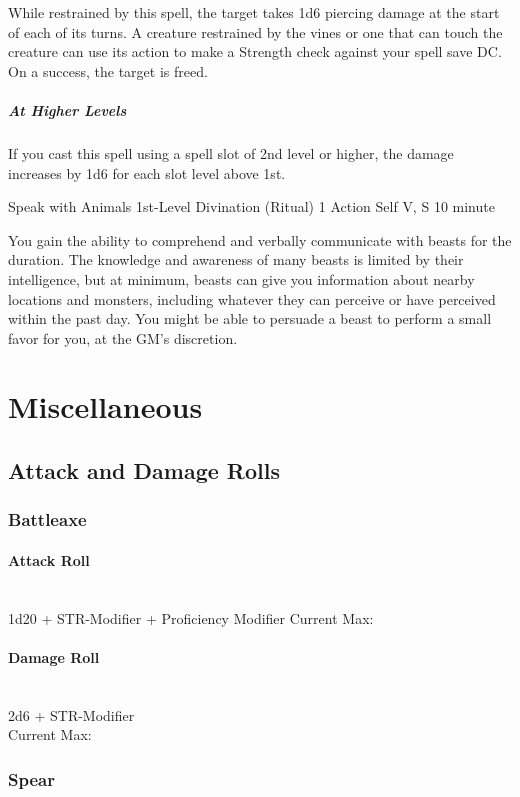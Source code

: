 \documentclass[letterpaper,openany,oneside,twocolumn]{book}
\begin{document}
While restrained by this spell, the target takes 1d6 piercing damage at the start of each of its turns. A creature restrained by the vines or one that can touch the creature can use its action to make a Strength check against your spell save DC. On a success, the target is freed.

\subparagraph*{At Higher Levels} If you cast this spell using a spell slot of 2nd level or higher, the damage increases by 1d6 for each slot level above 1st.

\DndSpellHeader
  {Speak with Animals}
  {1st-Level Divination (Ritual)}
  {1 Action}
  {Self}
  {V, S}
  {10 minute}

You gain the ability to comprehend and verbally communicate with beasts for the duration. The knowledge and awareness of many beasts is limited by their intelligence, but at minimum, beasts can give you information about nearby locations and monsters, including whatever they can perceive or have perceived within the past day. You might be able to persuade a beast to perform a small favor for you, at the GM's discretion.

\section*{Miscellaneous}
\subsection*{Attack and Damage Rolls}
\subsubsection*{Battleaxe}
\paragraph*{Attack Roll} \hfill\\
1d20 + STR-Modifier + Proficiency Modifier
Current Max: 
\paragraph*{Damage Roll} \hfill\\
2d6 + STR-Modifier \\
Current Max: 
\subsubsection*{Spear}
\end{document}
